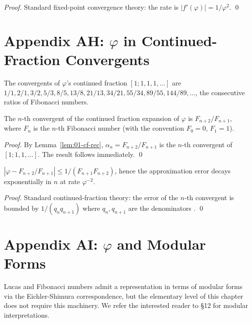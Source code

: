 \begin{proof}
Standard fixed-point convergence theory: the rate is $|f'(\varphi)|
= 1/\varphi^2$.
\qed
\end{proof}

\section*{Appendix AH: $\varphi$ in Continued-Fraction Convergents}
\label{sec:01-app-AH}

The convergents of $\varphi$'s continued fraction $[1; 1, 1, 1,
\ldots]$ are $1/1, 2/1, 3/2, 5/3, 8/5, 13/8, 21/13, 34/21, 55/34,
89/55, 144/89, \ldots$, the consecutive ratios of Fibonacci numbers.

\begin{theorem}
\label{thm:01-convergent-fib}
The $n$-th convergent of the continued fraction expansion of
$\varphi$ is $F_{n+2}/F_{n+1}$, where $F_n$ is the $n$-th Fibonacci
number (with the convention $F_0 = 0$, $F_1 = 1$).
\end{theorem}

\begin{proof}
By Lemma~\ref{lem:01-cf-rec}, $\alpha_n = F_{n+2}/F_{n+1}$ is the
$n$-th convergent of $[1; 1, 1, \ldots]$. The result follows
immediately.
\qed
\end{proof}

\begin{corollary}
\label{cor:01-approx-quality}
$|\varphi - F_{n+2}/F_{n+1}| \le 1/(F_{n+1} F_{n+2})$, hence the
approximation error decays exponentially in $n$ at rate $\varphi^{-2}$.
\end{corollary}

\begin{proof}
Standard continued-fraction theory: the error of the $n$-th
convergent is bounded by $1/(q_n q_{n+1})$ where $q_n, q_{n+1}$ are
the denominators \cite{niven_irrational}.
\qed
\end{proof}

\section*{Appendix AI: $\varphi$ and Modular Forms}
\label{sec:01-app-AI}

Lucas and Fibonacci numbers admit a representation in terms of
modular forms via the Eichler-Shimura correspondence, but the
elementary level of this chapter does not require this machinery.
We refer the interested reader to \cite{koshy_fib_lucas} \S 12 for
modular interpretations.

